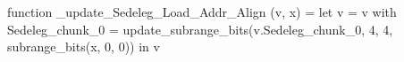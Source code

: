 function _update_Sedeleg_Load_Addr_Align (v, x) = let v = { v with Sedeleg_chunk_0 = update_subrange_bits(v.Sedeleg_chunk_0, 4, 4, subrange_bits(x, 0, 0)) } in
  v
